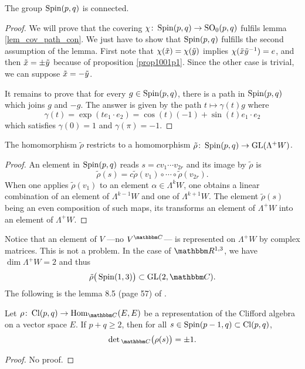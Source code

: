 \begin{proposition}
 The group $\operatorname{Spin}(p,q)$ is connected.
\end{proposition}

\begin{proof}
We will prove that the covering $\chi\colon \operatorname{Spin}(p,q)\to \operatorname{SO}_0(p,q)$ fulfils lemma \ref{lem_cov_path_con}. We just have to show that $\operatorname{Spin}(p,q)$ fulfills the second assumption of the lemma. First note that $\chi(\tilde{x})=\chi(\tilde{y})$ implies $\chi(\tilde{x}\tilde{y}^{-1})=e$, and then $\tilde{x}=\pm\tilde{y}$ because of proposition \ref{prop1001p1}. Since the other case is trivial, we can suppose $\tilde{x}=-\tilde{y}$.

It remains to prove that for every $g\in\operatorname{Spin}(p,q)$, there is a path in $\operatorname{Spin}(p,q)$ which joins $g$ and $-g$. The answer is given by the path $t\mapsto \gamma(t)g$ where
\[
\gamma(t)=\exp(te_1\cdot e_2)=\cos(t)(-1)+\sin(t)e_1\cdot e_2
\]
which satisfies $\gamma(0)=1$ and $\gamma(\pi)=-1$. 
\end{proof}

\begin{proposition}

The homomorphism $\tilde\rho$ restricts to a homomorphism $\tilde\rho\colon \operatorname{Spin}(p,q)\to \textup{GL}(\Lambda^+W)$.
\end{proposition}

\begin{proof}
An element in $\operatorname{Spin}(p,q)$ reads $s=cv_1\cdots v_{2r}$ and its image by $\tilde\rho$ is
\[ 
  \tilde\rho(s)=c\tilde\rho(v_1)\circ \cdots \circ\tilde\rho(v_{2r}).
\]
When one applies $\tilde\rho(v_1)$ to an element $\alpha\in\Lambda^kW$, one obtains a linear combination of an element of $\Lambda^{k-1}W$ and one of $\Lambda^{k+1}W$. The element $\tilde\rho(s)$ being an even composition of such maps, its transforms an element of $\Lambda^+W$ into an element of $\Lambda^+W$. 
\end{proof}

Notice that an element of $V$ ---no $V^{\eC}$--- is represented on $\Lambda^+W$ by complex matrices. This is not a problem. In the case of $\eR^{1,3}$, we have $\dim\Lambda^+W=2$ and thus 
\[ 
  \tilde\rho\big( \Spin(1,3) \big)\subset \GL(2,\eC).
\]
The following is the lemma 8.5 (page 57) of \cite{Michelson}.

\begin{lemma}
Let $\rho\colon \Cl(p,q)\to \Hom_{\eC}(E,E)$ be a representation of the Clifford algebra on a vector space $E$. If $p+q\geq 2$, then for all $s\in\operatorname{Spin}(p-1,q)\subset \operatorname{Cl}(p,q) $,
\[ 
  \det{}_{\eC}\big( \rho(s) \big)=\pm 1.
\]

\end{lemma}
\begin{proof}
No proof.
\end{proof}

